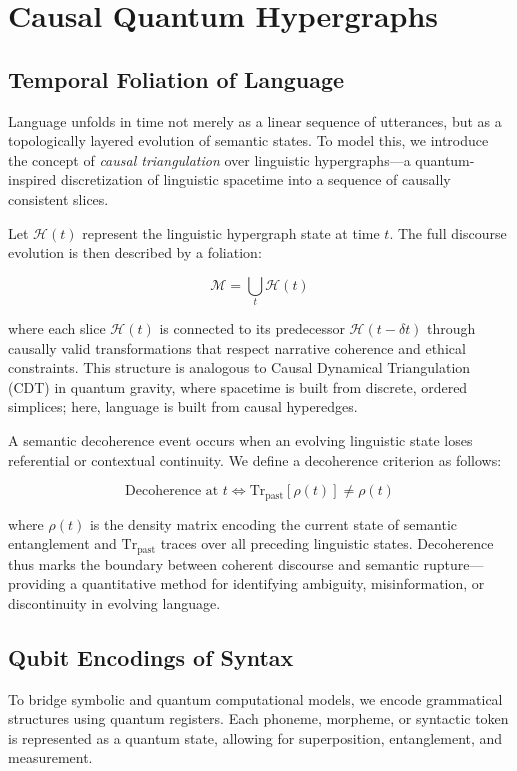 \documentclass{article}
\theoremstyle{plain}
\theoremstyle{claimstyle}
\begin{document}
\section{Causal Quantum Hypergraphs}

\subsection{Temporal Foliation of Language}

Language unfolds in time not merely as a linear sequence of utterances, but as a topologically layered evolution of semantic states. To model this, we introduce the concept of \textit{causal triangulation} over linguistic hypergraphs—a quantum-inspired discretization of linguistic spacetime into a sequence of causally consistent slices.

Let $\mathcal{H}(t)$ represent the linguistic hypergraph state at time $t$. The full discourse evolution is then described by a foliation:

\[
\mathcal{M} = \bigcup_{t} \mathcal{H}(t)
\]

where each slice $\mathcal{H}(t)$ is connected to its predecessor $\mathcal{H}(t - \delta t)$ through causally valid transformations that respect narrative coherence and ethical constraints. This structure is analogous to Causal Dynamical Triangulation (CDT) in quantum gravity, where spacetime is built from discrete, ordered simplices; here, language is built from causal hyperedges.

A semantic decoherence event occurs when an evolving linguistic state loses referential or contextual continuity. We define a decoherence criterion as follows:

\[
\text{Decoherence at } t \iff \text{Tr}_{\text{past}}\left[\rho(t)\right] \neq \rho(t)
\]

where $\rho(t)$ is the density matrix encoding the current state of semantic entanglement and $\text{Tr}_{\text{past}}$ traces over all preceding linguistic states. Decoherence thus marks the boundary between coherent discourse and semantic rupture—providing a quantitative method for identifying ambiguity, misinformation, or discontinuity in evolving language.

\subsection{Qubit Encodings of Syntax}

To bridge symbolic and quantum computational models, we encode grammatical structures using quantum registers. Each phoneme, morpheme, or syntactic token is represented as a quantum state, allowing for superposition, entanglement, and measurement.
\end{document}
